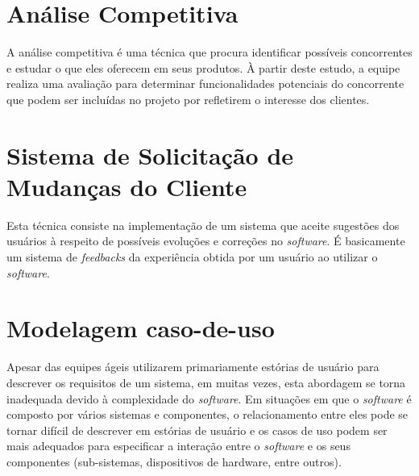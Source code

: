 \section{Análise Competitiva}
A análise competitiva é uma técnica que procura identificar possíveis concorrentes e estudar o que eles oferecem em seus produtos. À partir deste estudo, a equipe realiza uma avaliação para determinar funcionalidades potenciais do concorrente que podem ser incluídas no projeto por refletirem o interesse dos clientes.

\section{Sistema de Solicitação de Mudanças do Cliente}
Esta técnica consiste na implementação de um sistema que aceite sugestões dos usuários à respeito de possíveis evoluções e correções no \emph{software}. É basicamente um sistema de \emph{feedbacks} da experiência obtida por um usuário ao utilizar o \emph{software}.

\section{Modelagem caso-de-uso}
Apesar das equipes ágeis utilizarem primariamente estórias de usuário para descrever os requisitos de um sistema, em muitas vezes, esta abordagem se torna inadequada devido à complexidade do \emph{software}. Em situações em que o \emph{software} é composto por vários sistemas e componentes, o relacionamento entre eles pode se tornar difícil de descrever em estórias de usuário e os casos de uso podem ser mais adequados para especificar a interação entre o \emph{software} e os seus componentes (sub-sistemas, dispositivos de hardware, entre outros).
